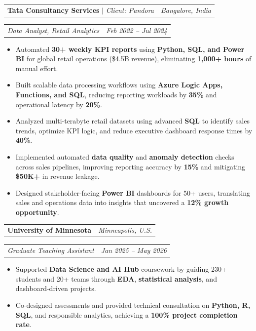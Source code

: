 \documentclass[10pt,letterpaper]{article}
\makeatletter
\newcommand{\roleonly}[2]{%
  \noindent
  \begin{tabularx}{\linewidth}{@{}X r@{}}
    \textit{#1} & \textit{#2}
  \end{tabularx}\vspace{0pt}%
}
\newcommand{\entrysep}{\vspace{2pt}}
\makeatother
\begin{document}
\entrysep

\noindent \begin{tabularx}{\linewidth}{@{} X r@{} }
{\fontsize{11pt}{13pt}\selectfont \textbf{Tata Consultancy Services} $|$ \textit{Client: Pandora}} & \textit{Bangalore, India} 
\end{tabularx}\vspace{-2pt}
\roleonly{Data Analyst, Retail Analytics}{Feb 2022 -- Jul 2024 }
\begin{itemize}
  \item Automated \textbf{30+ weekly KPI reports} using \textbf{Python, SQL, and Power BI} for global retail operations (\$4.5B revenue), eliminating \textbf{1,000+ hours} of manual effort.
  \item Built scalable data processing workflows using \textbf{Azure Logic Apps, Functions, and SQL}, reducing reporting workloads by \textbf{35\%} and operational latency by \textbf{20\%}.
  \item Analyzed multi-terabyte retail datasets using advanced \textbf{SQL} to identify sales trends, optimize KPI logic, and reduce executive dashboard response times by \textbf{40\%}.
  \item Implemented automated \textbf{data quality} and \textbf{anomaly detection} checks across sales pipelines, improving reporting accuracy by \textbf{15\%} and mitigating \textbf{\$50K+} in revenue leakage.
  \item Designed stakeholder-facing \textbf{Power BI} dashboards for 50+ users, translating sales and operations data into insights that uncovered a \textbf{12\% growth opportunity}.
\end{itemize}
\entrysep

\noindent \begin{tabularx}{\linewidth}{@{} X r@{} }
{\fontsize{11pt}{13pt}\selectfont \textbf{University of Minnesota}} & \textit{Minneapolis, U.S.} 
\end{tabularx}\vspace{-2pt}
\roleonly{Graduate Teaching Assistant}{Jan 2025 -- May 2026 }
\begin{itemize}
  \item Supported \textbf{Data Science and AI Hub} coursework by guiding 230+ students and 20+ teams through \textbf{EDA}, \textbf{statistical analysis}, and dashboard-driven projects.
  \item Co-designed assessments and provided technical consultation on \textbf{Python, R, SQL}, and responsible analytics, achieving a \textbf{100\% project completion rate}.
\end{itemize}
\end{document}
